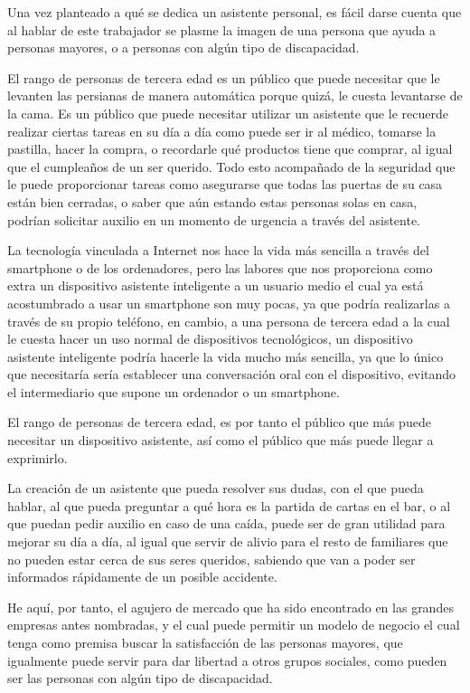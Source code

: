 Una vez planteado a qué se dedica un asistente personal, es fácil darse cuenta que al hablar de este trabajador se plasme la imagen de una persona que ayuda a personas mayores, o a personas con algún tipo de discapacidad.

El rango de personas de tercera edad es un público que puede necesitar que le levanten las persianas de manera automática porque quizá, le cuesta levantarse de la cama. Es un público que puede necesitar utilizar un asistente que le recuerde realizar ciertas tareas en su día a día como puede ser ir al médico, tomarse la pastilla, hacer la compra, o recordarle qué productos tiene que comprar, al igual que el cumpleaños de un ser querido. Todo esto acompañado de la seguridad que le puede proporcionar tareas como asegurarse que todas las puertas de su casa están bien cerradas, o saber que aún estando estas personas solas en casa, podrían solicitar auxilio en un momento de urgencia a través del asistente.

La tecnología vinculada a Internet nos hace la vida más sencilla a través del smartphone o de los ordenadores, pero las labores que nos proporciona como extra un dispositivo asistente inteligente a un usuario medio el cual ya está acostumbrado a usar un smartphone son muy pocas, ya que podría realizarlas a través de su propio teléfono, en cambio, a una persona de tercera edad a la cual le cuesta hacer un uso normal de dispositivos tecnológicos, un dispositivo asistente inteligente podría hacerle la vida mucho más sencilla, ya que lo único que necesitaría sería establecer una conversación oral con el dispositivo, evitando el intermediario que supone un ordenador o un smartphone.

El rango de personas de tercera edad, es por tanto el público que más puede necesitar un dispositivo asistente, así como el público que más puede llegar a exprimirlo.

La creación de un asistente que pueda resolver sus dudas, con el que pueda hablar, al que pueda preguntar a qué hora es la partida de cartas en el bar, o al que puedan pedir auxilio en caso de una caída, puede ser de gran utilidad para mejorar su día a día, al igual que servir de alivio para el resto de familiares que no pueden estar cerca de sus seres queridos, sabiendo que van a poder ser informados rápidamente de un posible accidente.

He aquí, por tanto, el agujero de mercado que ha sido encontrado en las grandes empresas antes nombradas, y el cual puede permitir un modelo de negocio el cual tenga como premisa buscar la satisfacción de las personas mayores, que igualmente puede servir para dar libertad a otros grupos sociales, como pueden ser las personas con algún tipo de discapacidad.


